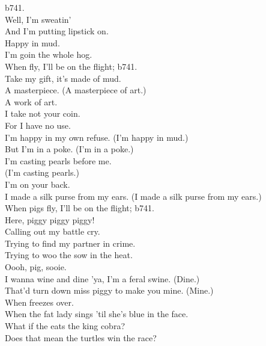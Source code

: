 

b741. \\

Well, I'm sweatin' \\
And I'm putting lipstick on. \\
Happy in mud. \\
I'm goin the whole hog. \\

When  fly, I'll be on the flight; b741. \\

Take my gift, it's made of mud. \\
A masterpiece. (A masterpiece of art.) \\
A work of art. \\

I take not your coin. \\
For I have no use. \\
I'm happy in my own refuse. (I'm happy in mud.) \\

But I'm in a poke. (I'm in a poke.) \\
I'm casting pearls before me. \\
(I'm casting pearls.) \\
I'm on your back. \\
I made a silk purse from my ears. (I made a silk purse from my ears.) \\

When pigs fly, I'll be on the flight; b741. \\

Here, piggy piggy piggy! \\

Calling out my battle cry. \\
Trying to find my partner in crime. \\
Trying to woo the sow in the heat. \\
Oooh, pig, sooie. \\

I wanna wine and dine 'ya, I'm a feral swine. (Dine.) \\
That'd turn down miss piggy to make you mine. (Mine.) \\

When  freezes over. \\
When the fat lady sings 'til she's blue in the face. \\
What if the  eats the king cobra? \\
Does that mean the turtles win the race? \\

